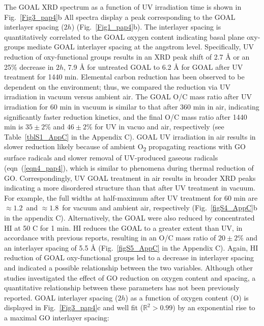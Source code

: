 The GOAL XRD spectrum as a function of UV irradiation time is shown in Fig.~\ref{Fig3_pap4}b All spectra display a peak corresponding to the GOAL interlayer spacing ($2h$) (Fig.~\ref{Fig1_pap4}b). The interlayer spacing is quantitatively correlated to the GOAL oxygen content indicating basal plane oxy-groups mediate GOAL interlayer spacing at the angstrom level. Specifically, UV reduction of oxy-functional groups results in an XRD peak shift of 2.7 {\AA} or an 25\% decrease in $2h$, 7.9 {\AA} for untreated GOAL to 6.2 {\AA} for GOAL after UV treatment for 1440 min. Elemental carbon reduction has been observed to be dependent on the environment;\cite{Pei2012} thus, we compared the reduction via UV irradiation in vacuum versus ambient air. The GOAL O/C mass ratio after UV irradiation for 60 min in vacuum is similar to that after 360 min in air, indicating significantly faster reduction kinetics, and the final O/C mass ratio after 1440 min is $35\pm2$\% and $46\pm2$\% for UV in vacuo and air, respectively (see Table~\ref{tblS1_AppC} in the Appendix C). GOAL UV irradiation in air results in slower reduction likely because of ambient O\textsubscript{2} propagating reactions with GO surface radicals and slower removal of UV-produced gaseous radicals (eqn~(\ref{eqn4_pap4}), which is similar to phenomena during thermal reduction of GO.\cite{bagri2010structural,mattevi2009evolution} Correspondingly, UV GOAL treatment in air results in broader XRD peaks indicating a more disordered structure than that after UV treatment in vacuum. For example, the full widths at half-maximum after UV treatment for 60 min are $\approx1.2$\textdegree \ and  $\approx1.8$\textdegree \ for vacuum and ambient air, respectively (Fig.~\ref{figS4_AppC}b in the appendix C). Alternatively, the GOAL were also reduced by concentrated HI at 50 \textdegree C for 1 min. HI reduces the GOAL to a greater extent than UV, in accordance with previous reports,\cite{su2014impermeable,pei2010direct} resulting in an O/C mass ratio of $20 \pm 2$\% and an interlayer spacing of 5.5 {\AA} (Fig.~\ref{figS5_AppC} in the Appendix C). Again, HI reduction of GOAL oxy-functional groups led to a decrease in interlayer spacing and indicated a possible relationship between the two variables. Although other studies investigated the effect of GO reduction on oxygen content and spacing,\cite{andrikopoulos2014effect,alhadhrami2016thermal} a quantitative relationship between these parameters has not been previously reported. GOAL interlayer spacing ($2h$) as a function of oxygen content (O) is displayed in Fig.~\ref{Fig3_pap4}c  and well fit ($\mathbb{R}^{2}> 0.99$) by an exponential rise to a maximal GO interlayer spacing:
